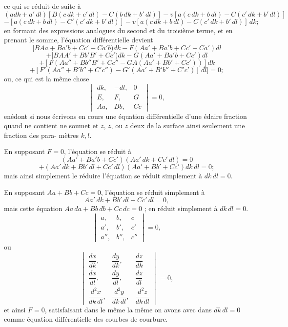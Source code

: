 \documentclass[11pt,a4paper]{article}
\theoremstyle{plain}
\theoremstyle{definition}
\begin{document}
\noindent
ce qui se r\'eduit de suite \`a
\[
(adk + a'\,dl)\!\left[B(c\,dk + c'\,dl) - C(b\,dk + b'\,dl)\right] - v\!\left[a(c\,dk + b\,dl) - C(c'\,dk + b'\,dl)\right]
\]
\[
- [a(c\,dk + b\,dl) - C'(c'\,dk + b'\,dl)] - v\!\left[a(c\,dk + b\,dl) - C(c'\,dk + b'\,dl)\right]\,dk;
\]
en formant des expressions analogues du second et du troisi\`eme terme, et en prenant
le somme, l'\'equation diff\'erentielle devient
\[
[BAa + Ba'b + Cc' - Ca'b)dk - F(Aa' + Ba'b + Cc' + Ca')dl
\]
\[
+ [BAA' + Bb'B' + Cc')dk - G(Aa' + Ba'b + Cc')dl
\]
\[
+ [F(Aa'' + Bb''B' + Cc'' - GA(Aa' + Bb' + Cc'))]dk
\]
\[
+ [F'(Aa'' + B'b'' + C'c'') - G'(Aa' + B'b'' + C'c')]\,dl] \!= 0;
\]
ou, ce qui est la m\^eme chose
\[
\begin{vmatrix}
dk, & -dl, & 0 \\
E, & F, & G \\
Aa, & Bb, & Cc
\end{vmatrix} = 0,
\]
en\'edont si nous \'ecrivons en cours une \'equation diff\'erentielle d'une \'edaire fraction quand
ne contient ne soumet et $z$, $z$, ou $z$ deux de la surface ainsi seulement une fraction des para-
m\`etres $k, l$.

En supposant $F = 0$, l'\'equation se r\'eduit \`a
\[
(Aa' + Ba'b + Cc')(Aa'\,dk + Cc'\,dl) = 0
\]
\[
+ (Aa'\,dk + Bb'\,dl + Cc'\,dl)(Aa' + Bb' + Cc')dk\,dl = 0;
\]
mais ainsi simplement le r\'eduire l'\'equation se r\'eduit simplement \`a $dk\,dl = 0$.

En supposant $Aa + Bb + Cc = 0$, l'\'equation se r\'eduit simplement \`a
\[
Aa'\,dk + Bb'\,dl + Cc'\,dl = 0,
\]
mais cette \'equation $Aa\,da + Bb\,db + Cc\,dc = 0$ ; en r\'eduit simplement \`a $dk\,dl = 0$.
\[
\begin{vmatrix}
a, & b, & c \\
a', & b', & c' \\
a'', & b'', & c''
\end{vmatrix} = 0,
\]
ou
\[
\begin{vmatrix}
\dfrac{dx}{dk}, & \dfrac{dy}{dk}, & \dfrac{dz}{dk} \\[6pt]
\dfrac{dx}{dl}, & \dfrac{dy}{dl}, & \dfrac{dz}{dl} \\[6pt]
\dfrac{d^2x}{dk\,dl}, & \dfrac{d^2y}{dk\,dl}, & \dfrac{d^2z}{dk\,dl}
\end{vmatrix} = 0,
\]
et ainsi $F = 0$, satisfaisant dans le m\^eme la m\^eme on avons avec dans $dk\,dl = 0$ comme
\'equation diff\'erentielle des courbes de courbure.

\clearpage
\end{document}
